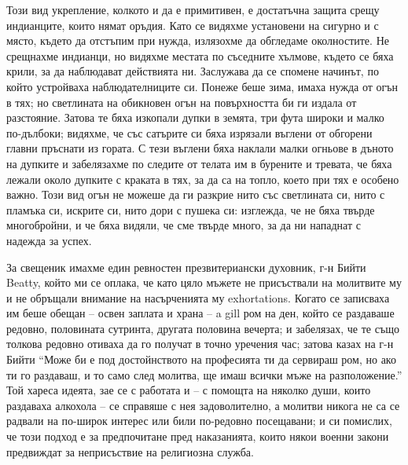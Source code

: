 \documentclass[12pt]{book}
\begin{document}
Този вид укрепление, колкото и да е примитивен, е достатъчна защита срещу индианците, които нямат оръдия. Като се видяхме установени на сигурно и с място, където да отстъпим при нужда, излязохме да обгледаме околностите. Не срещнахме индианци, но видяхме местата по съседните хълмове, където се бяха крили, за да наблюдават действията ни. Заслужава да се спомене начинът, по който устройваха наблюдателниците си. Понеже беше зима, имаха нужда от огън в тях; но светлината на обикновен огън на повърхността би ги издала от разстояние. Затова те бяха изкопали дупки в земята, три фута широки и малко по-дълбоки; видяхме, че със сатърите си бяха изрязали въглени от обгорени главни пръснати из гората. С тези въглени бяха наклали малки огньове в дъното на дупките и забелязахме по следите от телата им в бурените и тревата, че бяха лежали около дупките с краката в тях, за да са на топло, което при тях е особено важно. Този вид огън не можеше да ги разкрие нито със светлината си, нито с пламъка си, искрите си, нито дори с пушека си: изглежда, че не бяха твърде многобройни, и че бяха видяли, че сме твърде много, за да ни нападнат с надежда за успех. 

За свещеник имахме един ревностен презвитериански духовник, г-н Бийти Beatty, който ми се оплака, че като цяло мъжете не присъствали на молитвите му и не обръщали внимание на насърченията му exhortations. Когато се записваха им беше обещан – освен заплата и храна – a gill ром на ден, който се раздаваше редовно, половината сутринта, другата половина вечерта; и забелязах, че те също толкова редовно отиваха да го получат в точно уречения час; затова казах на г-н Бийти “Може би е под достойнството на професията ти да сервираш ром, но ако ти го раздаваш, и то само след молитва, ще имаш всички мъже на разположение.” Той хареса идеята, зае се с работата и – с помощта на няколко души, които раздаваха алкохола – се справяше с нея задоволително, а молитви никога не са се радвали на по-широк интерес или били по-редовно посещавани; и си помислих, че този подход е за предпочитане пред наказанията, които някои военни закони предвиждат за неприсъствие на религиозна служба.
\end{document}
